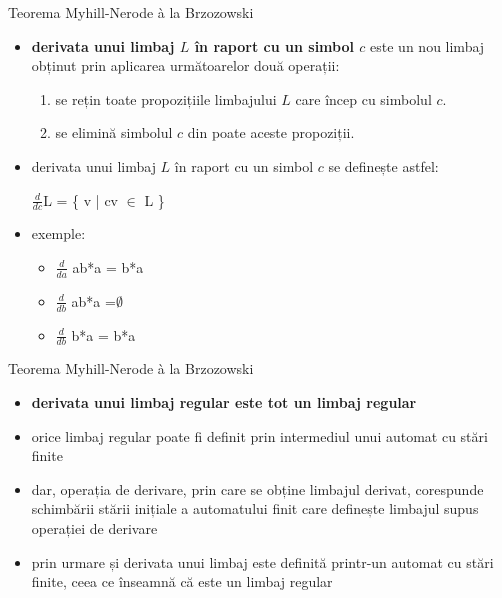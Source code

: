 \documentclass[pdf]{beamer}
\begin{document}
\begin{frame}{Teorema Myhill-Nerode à la Brzozowski}
\begin{itemize}
\item
\textbf{derivata unui limbaj $L$ în raport cu un simbol $c$} este un nou limbaj obținut prin aplicarea următoarelor două operații:

\begin{enumerate}
\item
se rețin toate propozițiile limbajului $L$ care încep cu simbolul $c$.
\item
se elimină simbolul $c$ din poate aceste propoziții.
\end{enumerate}

\item
derivata unui limbaj $L$ în raport cu un simbol $c$ se definește astfel:

$\frac{d}{ dc}$L = \{ v | cv $\in$ L \}

\item
exemple:
\begin{itemize}
\item
$\frac{d}{da}$ ab*a = b*a
\item
$\frac{d}{db}$ ab*a =$\emptyset$
\item
$\frac{d}{db}$ b*a = b*a
\end{itemize}
\end{itemize}
\end{frame}



\begin{frame}{Teorema Myhill-Nerode à la Brzozowski}
\begin{itemize}
\item
\textbf{derivata unui limbaj regular este tot un limbaj regular}
\item
orice limbaj regular poate fi definit prin intermediul unui automat cu stări finite
\item
dar, operația de derivare, prin care se obține limbajul derivat, corespunde schimbării stării inițiale a automatului finit care definește limbajul supus operației de derivare
\item
prin urmare și derivata unui limbaj este definită printr-un automat cu stări finite, ceea ce înseamnă că este un limbaj regular
\end{itemize}
\end{frame}
\end{document}
